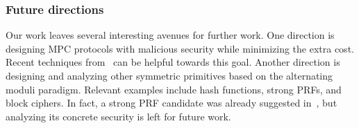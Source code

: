 \subsubsection{Future directions}
Our work leaves several interesting avenues for further work. One direction is designing MPC protocols with malicious security while minimizing the extra cost. Recent techniques from~\cite{BBCGI19,BGIN19} can be helpful towards this goal. Another direction is designing and analyzing other symmetric primitives based on the alternating moduli paradigm. Relevant examples include hash functions, strong PRFs, and block ciphers. In fact, a strong PRF candidate was already suggested in~\cite{boneh2018-darkmatter}, but analyzing its concrete security is left for future work.

